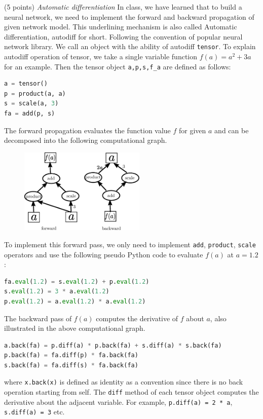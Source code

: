 \documentclass[a4paper, 12pt]{exam}
\begin{document}
	\begin{questions}
		\question (5 points) \emph{Automatic differentiation} In class, we have learned that to build a neural network, we need to implement the forward
		and backward propagation of given network model. This underlining mechanism is also called Automatic differentiation, autodiff for short.
		Following the convention of popular neural network library. We call an object with the ability of autodiff \texttt{tensor}.
		To explain autodiff operation of tensor, we take a single variable function $f(a) = a^2 + 3a$ for an example. Then the tensor object
		\texttt{a,p,s,f\_a} are defined as follows:
		\begin{lstlisting}[language=Python]
a = tensor()
p = product(a, a)
s = scale(a, 3)
fa = add(p, s)
		\end{lstlisting}
		The forward propagation evaluates the function value $f$ for given $a$ and can be decomposed into the following computational graph.
		\begin{figure}[!ht]
			\centering
			\includegraphics[width=6cm]{auto.eps}
		\end{figure}
		To implement this forward pass, we only need to implement \texttt{add}, \texttt{product}, \texttt{scale} operators and use the following pseudo Python code
		to evaluate $f(a)$ at $a=1.2$:
		\begin{lstlisting}[language=Python]
fa.eval(1.2) = s.eval(1.2) + p.eval(1.2)
s.eval(1.2) = 3 * a.eval(1.2)
p.eval(1.2) = a.eval(1.2) * a.eval(1.2)
		\end{lstlisting}
		The backward pass of $f(a)$ computes the derivative of $f$ about $a$, also illustrated in the above computational graph.
		\begin{lstlisting}[language=Python]
a.back(fa) = p.diff(a) * p.back(fa) + s.diff(a) * s.back(fa)
p.back(fa) = fa.diff(p) * fa.back(fa)
s.back(fa) = fa.diff(s) * fa.back(fa)
		\end{lstlisting}
		where \texttt{x.back(x)} is defined as identity as a convention since there is no back operation starting from self.
		The \texttt{diff} method of each tensor object computes the derivative about the adjacent variable.
		For example, \texttt{p.diff(a) = 2 * a}, \texttt{s.diff(a) = 3} etc.
		

\end{questions}
\end{document}
